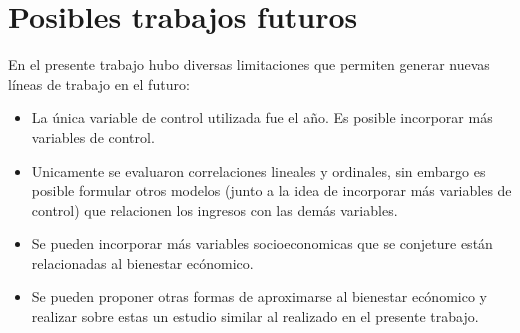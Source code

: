 \chapter{Posibles trabajos futuros} \label{chapter:trabajos_futuros}

En el presente trabajo hubo diversas limitaciones que permiten generar nuevas líneas de trabajo en el futuro:

\begin{itemize}
    \item La única variable de control utilizada fue el año. Es posible incorporar más variables de control.
    \item Unicamente se evaluaron correlaciones lineales y ordinales, sin embargo es posible formular otros modelos (junto a la idea de incorporar más variables de control) que relacionen los ingresos con las demás variables.
    \item Se pueden incorporar más variables socioeconomicas que se conjeture están relacionadas al bienestar ecónomico.
    \item Se pueden proponer otras formas de aproximarse al bienestar ecónomico y realizar sobre estas un estudio similar al realizado en el presente trabajo.
\end{itemize}

